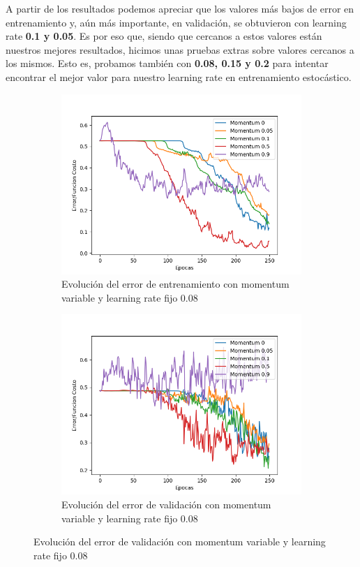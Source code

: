 A partir de los resultados podemos apreciar que los valores más bajos de error en entrenamiento y, aún más importante, en validación, se obtuvieron con
learning rate \textbf{0.1 y 0.05}. Es por eso que, siendo que cercanos a estos valores están nuestros mejores resultados, hicimos unas pruebas extras sobre
valores cercanos a los mismos. Esto es, probamos también con \textbf{0.08, 0.15 y 0.2} para intentar encontrar el mejor valor para nuestro learning rate en
entrenamiento estocástico.

\begin{figure}[!htbp]
\centering
\begin{subfigure}{.5\textwidth}
  \centering
  \includegraphics[width=1\linewidth]{graficos/eta_x_momentum_promedios_entrenamiento_0_08.png}
  \caption{Evolución del error de entrenamiento con momentum variable y learning rate fijo 0.08}
  \label{fig:sub1}
\end{subfigure}%
\begin{subfigure}{.5\textwidth}
  \centering
  \includegraphics[width=1\linewidth]{graficos/eta_x_momentum_promedios_validacion_0_08.png}
  \caption{Evolución del error de validación con momentum variable y learning rate fijo 0.08}
  \label{fig:sub2}
\end{subfigure}
\end{figure}

